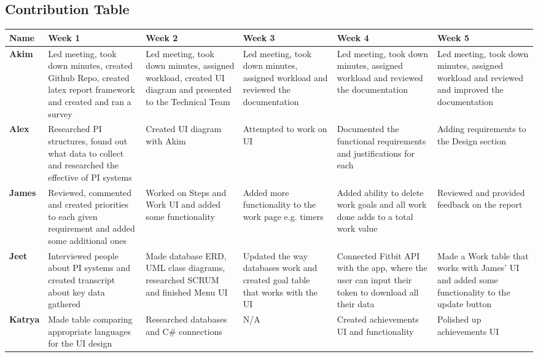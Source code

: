 \documentclass[12pt]{article}
\begin{document}
\newpage
\subsection{Contribution Table}

\begin{table}[!ht]
\begin{adjustwidth}{-3cm}{-3cm}
\centering
\begin{tabular}{|p{1.5cm}|p{3.1cm}|p{3cm}|p{3cm}|p{3cm}|p{3cm}|}
\hline
\textbf {Name} & \textbf{Week 1} & \textbf{Week 2} & \textbf{Week 3} & \textbf{Week 4} & \textbf{Week 5} \\
\hline
\textbf{Akim} & Led meeting, took down minutes, created Github Repo, created latex report framework and created and ran a survey& Led meeting, took down minutes, assigned workload, created UI diagram and presented to the Technical Team &  Led meeting, took down minutes, assigned workload and reviewed the documentation &  Led meeting, took down minutes, assigned workload and reviewed the documentation& Led meeting, took down minutes, assigned workload and reviewed and improved the documentation \\
\hline
\textbf{Alex} & Researched PI structures, found out what data to collect and researched the effective of PI systems & Created UI diagram with Akim & Attempted to work on UI  & Documented the functional requirements and justifications for each & Adding requirements to the Design section \\
\hline
\textbf{James} & Reviewed, commented and created priorities to each given requirement and added some additional ones & Worked on Steps and Work UI and added some functionality & Added more functionality to the work page e.g. timers & Added ability to delete work goals and all work done adds to a total work value & Reviewed and provided feedback on the report \\
\hline
\textbf{Jeet} & Interviewed people about PI systems and created transcript about key data gathered & Made database ERD, UML class diagrams, researched SCRUM and finished Menu UI & Updated the way databases work and created goal table that works with the UI & Connected Fitbit API with the app, where the user can input their token to download all their data & Made a Work table that works with James' UI and added some functionality to the update button \\
\hline
\textbf{Katrya} & Made table comparing appropriate languages for the UI design & Researched databases and C\# connections & N/A & Created achievements UI and functionality & Polished up achievements UI \\
\hline
\end{tabular}
\end{adjustwidth}
\end{table}
\end{document}
